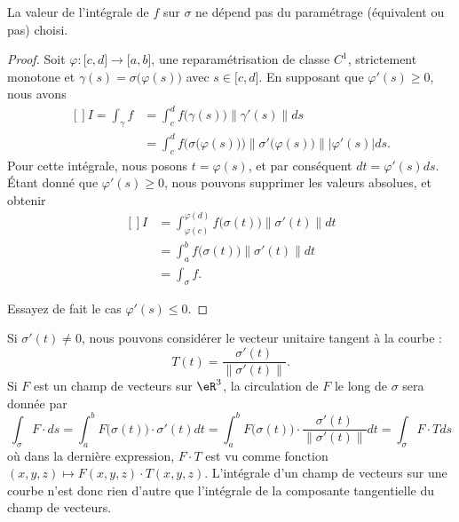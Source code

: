 \begin{proposition}
    La valeur de l'intégrale de $f$ sur $\sigma$ ne dépend pas du paramétrage (équivalent ou pas) choisi.
\end{proposition}

\begin{proof}
    Soit $\varphi\colon \mathopen[ c , d \mathclose]\to \mathopen[ a , b \mathclose]$, une reparamétrisation de classe $C^1$, strictement monotone et $\gamma(s)=\sigma\big( \varphi(s) \big)$ avec $s\in\mathopen[ c , d \mathclose]$. En supposant que $\varphi'(s)\geq 0$, nous avons
    \begin{equation}
        \begin{aligned}[]
            I=\int_{\gamma}f&=\int_c^df\big( \gamma(s) \big)\| \gamma'(s) \|ds\\
            &=\int_c^df\Big( \sigma\big( \varphi(s) \big) \Big)\| \sigma'\big( \varphi(s) \big) \| |\varphi'(s) |ds.
        \end{aligned}
    \end{equation}
    Pour cette intégrale, nous posons $t=\varphi(s)$, et par conséquent $dt=\varphi'(s)ds$. Étant donné que $\varphi'(s)\geq 0$, nous pouvons supprimer les valeurs absolues, et obtenir
    \begin{equation}
        \begin{aligned}[]
            I&=\int_{\varphi(c)}^{\varphi(d)}f\big( \sigma(t) \big)\| \sigma'(t) \|dt\\
            &=\int_a^bf\big( \sigma(t) \big)\| \sigma'(t) \|dt\\
            &=\int_{\sigma}f.
        \end{aligned}
    \end{equation}

    Essayez de fait le cas $\varphi'(s)\leq 0$. 
\end{proof}

\begin{remark}
    Si $\sigma'(t)\neq 0$, nous pouvons considérer le vecteur unitaire tangent à la courbe :
    \begin{equation}
        T(t)=\frac{ \sigma'(t) }{ \| \sigma'(t) \| }.
    \end{equation}
    Si $F$ est un champ de vecteurs sur $\eR^3$, la circulation de $F$ le long de $\sigma$ sera donnée par 
    \begin{equation}
        \int_{\sigma}F\cdot ds=\int_a^b F\big( \sigma(t) \big)\cdot \sigma'(t)dt=\int_{a}^bF\big( \sigma(t) \big)\cdot\frac{ \sigma'(t) }{ \| \sigma'(t) \| }dt=\int_{\sigma} F\cdot T ds
    \end{equation}
    où dans la dernière expression, $F\cdot T$ est vu comme fonction $(x,y,z)\mapsto F(x,y,z)\cdot T(x,y,z)$. L'intégrale d'un champ de vecteurs sur une courbe n'est donc rien d'autre que l'intégrale de la composante tangentielle du champ de vecteurs.
\end{remark}

